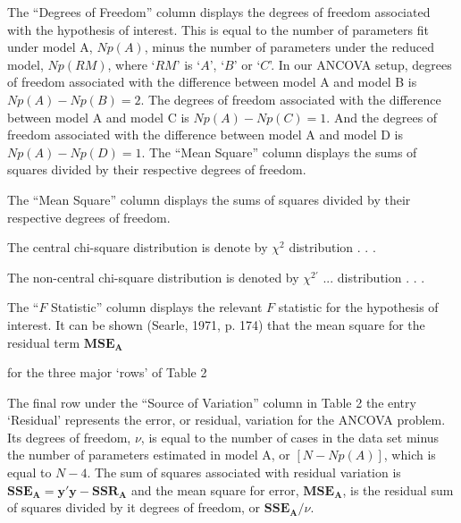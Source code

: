 \documentclass[11pt, oneside]{article}   	%
\begin{document}
  

\vspace{2 mm}

The ``Degrees of Freedom'' column displays the degrees of freedom associated with the hypothesis of interest.  This is equal to the number of parameters fit under model A, $  Np(A) $, minus the number of parameters under the reduced model, $  Np(RM) $, where `$RM$' is `$A$', `$B$' or `$C$'.  In our ANCOVA setup, degrees of freedom associated with the difference between model A and model B is $  Np(A) - Np(B) = 2  $.  The degrees of freedom associated with the difference between model A and model C is $  Np(A) - Np(C) = 1  $.  And the degrees of freedom associated with the difference between model A and model D is $  Np(A) - Np(D) = 1  $.  The ``Mean Square'' column displays the sums of squares divided by their respective degrees of freedom.  

\vspace{2 mm}

The ``Mean Square'' column displays the sums of squares divided by their respective degrees of freedom.  

The central chi-square distribution is denote by $ \chi^{2}  $ distribution . . . 

The non-central chi-square distribution is denoted by $ \chi^{2'} $ ... distribution . . . 


The ``$F$ Statistic'' column displays the relevant $F$ statistic for the hypothesis of interest.  It can be shown (Searle, 1971, p. 174) that the mean square for the residual term $ \mathbf{MSE_{A}}  $

 for the three major `rows' of Table 2      

\vspace{2 mm}

The final row under the ``Source of Variation'' column in Table 2 the entry `Residual' represents the error, or residual, variation for the ANCOVA problem.  Its degrees of freedom, $ \nu $, is equal to the number of cases in the data set minus the number of parameters estimated in model A, or $ [N - Np(A)]  $, which is equal to $ N - 4  $.  The sum of squares associated with residual variation is $ \mathbf{SSE_{A}} =  \mathbf{y'y} - \mathbf{SSR_{A}}  $ and the mean square for error, $ \mathbf{MSE_{A}}  $, is the residual sum of squares divided by it degrees of freedom, or $  \mathbf{SSE_{A}} / \nu $.    
                            
\bigskip
\end{document}
